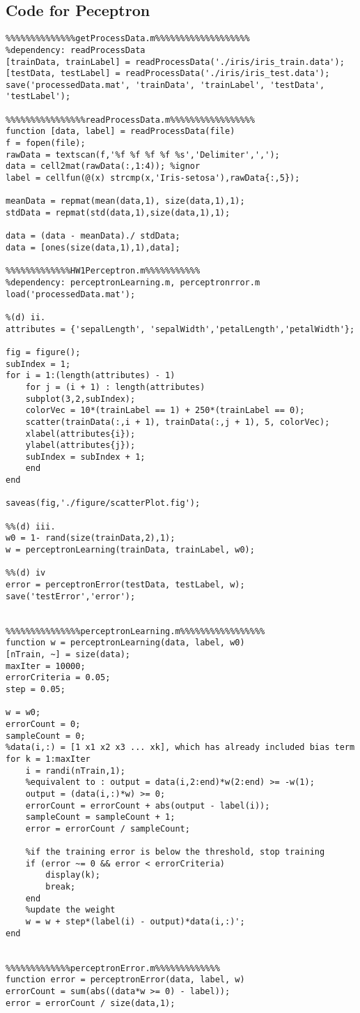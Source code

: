 \documentclass[12pt]{article} %
\theoremstyle{definition}\newtheorem{law}{Law}
\theoremstyle{plain}\newtheorem{jury}[law]{Jury}
\theoremstyle{remark}\newtheorem{juu}{Juu}
\theoremstyle{definition}\newtheorem{kuu}[law]{Kuu}
\theoremstyle{definition}\newtheorem{muu}{Muu}[section]
\theoremstyle{definition}\newtheorem{honoluu}{Honoluu}[section]
\theoremstyle{definition}\newtheorem{konoluu}[muu]{Konoluu}
\begin{document}
\subsection{Code for Peceptron}
\begin{lstlisting}
%%%%%%%%%%%%%%getProcessData.m%%%%%%%%%%%%%%%%%%%
%dependency: readProcessData
[trainData, trainLabel] = readProcessData('./iris/iris_train.data');
[testData, testLabel] = readProcessData('./iris/iris_test.data');
save('processedData.mat', 'trainData', 'trainLabel', 'testData', 'testLabel');

%%%%%%%%%%%%%%%%readProcessData.m%%%%%%%%%%%%%%%%%
function [data, label] = readProcessData(file)
f = fopen(file);
rawData = textscan(f,'%f %f %f %f %s','Delimiter',',');
data = cell2mat(rawData(:,1:4)); %ignor
label = cellfun(@(x) strcmp(x,'Iris-setosa'),rawData{:,5});

meanData = repmat(mean(data,1), size(data,1),1);
stdData = repmat(std(data,1),size(data,1),1);

data = (data - meanData)./ stdData;
data = [ones(size(data,1),1),data];

%%%%%%%%%%%%%HW1Perceptron.m%%%%%%%%%%%
%dependency: perceptronLearning.m, perceptronrror.m
load('processedData.mat');

%(d) ii.
attributes = {'sepalLength', 'sepalWidth','petalLength','petalWidth'};

fig = figure();
subIndex = 1;
for i = 1:(length(attributes) - 1)
    for j = (i + 1) : length(attributes)
    subplot(3,2,subIndex);
    colorVec = 10*(trainLabel == 1) + 250*(trainLabel == 0);
    scatter(trainData(:,i + 1), trainData(:,j + 1), 5, colorVec);
    xlabel(attributes{i});
    ylabel(attributes{j});
    subIndex = subIndex + 1;
    end
end

saveas(fig,'./figure/scatterPlot.fig');

%%(d) iii.
w0 = 1- rand(size(trainData,2),1);
w = perceptronLearning(trainData, trainLabel, w0);

%%(d) iv
error = perceptronError(testData, testLabel, w);
save('testError','error');


%%%%%%%%%%%%%%%perceptronLearning.m%%%%%%%%%%%%%%%%%
function w = perceptronLearning(data, label, w0)
[nTrain, ~] = size(data);
maxIter = 10000;
errorCriteria = 0.05;
step = 0.05;

w = w0;
errorCount = 0;
sampleCount = 0;
%data(i,:) = [1 x1 x2 x3 ... xk], which has already included bias term
for k = 1:maxIter
    i = randi(nTrain,1);
    %equivalent to : output = data(i,2:end)*w(2:end) >= -w(1);
    output = (data(i,:)*w) >= 0;
    errorCount = errorCount + abs(output - label(i));
    sampleCount = sampleCount + 1;
    error = errorCount / sampleCount;
    
    %if the training error is below the threshold, stop training
    if (error ~= 0 && error < errorCriteria)
        display(k);
        break;
    end
    %update the weight
    w = w + step*(label(i) - output)*data(i,:)';
end


%%%%%%%%%%%%%perceptronError.m%%%%%%%%%%%%%
function error = perceptronError(data, label, w)
errorCount = sum(abs((data*w >= 0) - label));
error = errorCount / size(data,1);
\end{lstlisting}
\end{document}
